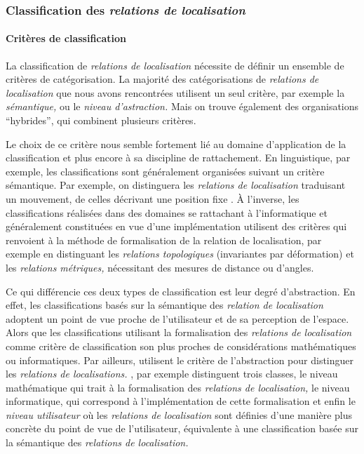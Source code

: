 \subsubsection{Classification des \emph{relations de localisation}}



\paragraph{Critères de classification}

La classification de \emph{relations de localisation} nécessite de
définir un ensemble de critères de catégorisation. La majorité des
catégorisations de \emph{relations de localisation} que nous avons
rencontrées utilisent un seul critère, par exemple la
\emph{sémantique,} ou le\emph{ niveau d'astraction.} Mais on trouve
également des organisations \enquote{hybrides}, qui combinent
plusieurs critères.

Le choix de ce critère nous semble fortement lié au domaine
d’application de la classification et plus encore à sa discipline de
rattachement. En linguistique, par exemple, les classifications sont
généralement organisées suivant un critère sémantique. Par exemple, on
distinguera les \emph{relations de localisation} traduisant un
mouvement, de celles décrivant une position fixe
\autocite{Borillo1998}. À l'inverse, les classifications réalisées
dans des domaines se rattachant à l'informatique et généralement
constituées en vue d'une implémentation utilisent des critères qui
renvoient à la méthode de formalisation de la relation de
localisation, par exemple en distinguant les \emph{relations
  topologiques} (\ie invariantes par déformation) et les
\emph{relations métriques,} nécessitant des mesures de distance ou
d'angles.

Ce qui différencie ces deux types de classification est leur degré
d'abstraction. En effet, les classifications basés sur la sémantique
des \emph{relation de localisation} adoptent un point de vue proche de
l'utilisateur et de sa perception de l'espace. Alors que les
classifications utilisant la formalisation des \emph{relations de
  localisation} comme critère de classification son plus proches de
considérations mathématiques ou
informatiques. Par ailleurs, \textcite{Clementini2008,Bucher2012}
utilisent le critère de l’abstraction pour distinguer les \emph{relations de
localisations.} \textcite{Clementini2008}, par exemple distinguent
trois classes, le niveau mathématique qui trait à la formalisation des
\emph{relations de localisation,} le niveau informatique, qui
correspond à l'implémentation de cette formalisation et enfin le
\emph{niveau utilisateur} où les \emph{relations de localisation} sont
définies d'une manière plus concrète du point de vue de l'utilisateur,
\ie équivalente à une classification basée sur la sémantique des
\emph{relations de localisation.}


